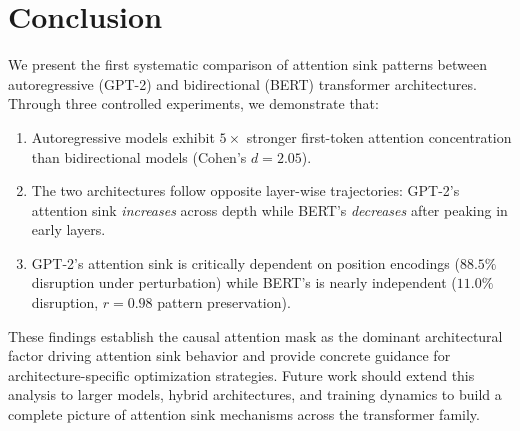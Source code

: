\documentclass{article}
\begin{document}
\section{Conclusion}

We present the first systematic comparison of attention sink patterns between autoregressive (GPT-2) and bidirectional (BERT) transformer architectures. Through three controlled experiments, we demonstrate that:

\begin{enumerate}
    \item Autoregressive models exhibit $5\times$ stronger first-token attention concentration than bidirectional models (Cohen's $d = 2.05$).
    \item The two architectures follow opposite layer-wise trajectories: GPT-2's attention sink \emph{increases} across depth while BERT's \emph{decreases} after peaking in early layers.
    \item GPT-2's attention sink is critically dependent on position encodings ($88.5\%$ disruption under perturbation) while BERT's is nearly independent ($11.0\%$ disruption, $r = 0.98$ pattern preservation).
\end{enumerate}

These findings establish the causal attention mask as the dominant architectural factor driving attention sink behavior and provide concrete guidance for architecture-specific optimization strategies. Future work should extend this analysis to larger models, hybrid architectures, and training dynamics to build a complete picture of attention sink mechanisms across the transformer family.



\end{document}
